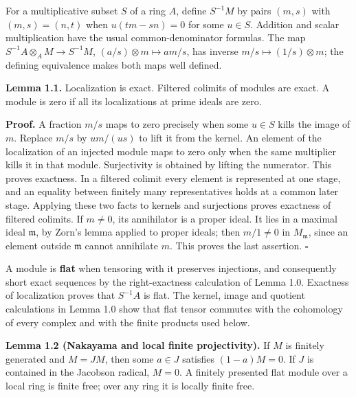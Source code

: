 \documentclass[11pt,a4paper,openany]{report}
\begin{document}
For a multiplicative subset \(S\) of a ring \(A\), define \(S^{-1}M\) by pairs \((m,s)\) with \((m,s)=(n,t)\) when \(u(tm-sn)=0\) for some \(u\in S\). Addition and scalar multiplication have the usual common-denominator formulas. The map \(S^{-1}A\otimes_A M\to S^{-1}M\), \((a/s)\otimes m\mapsto am/s\), has inverse \(m/s\mapsto (1/s)\otimes m\); the defining equivalence makes both maps well defined.

\textbf{Lemma 1.1.} Localization is exact. Filtered colimits of modules are exact. A module is zero if all its localizations at prime ideals are zero.

\textbf{Proof.} A fraction \(m/s\) maps to zero precisely when some \(u\in S\) kills the image of \(m\). Replace \(m/s\) by \(um/(us)\) to lift it from the kernel. An element of the localization of an injected module maps to zero only when the same multiplier kills it in that module. Surjectivity is obtained by lifting the numerator. This proves exactness. In a filtered colimit every element is represented at one stage, and an equality between finitely many representatives holds at a common later stage. Applying these two facts to kernels and surjections proves exactness of filtered colimits. If \(m\ne0\), its annihilator is a proper ideal. It lies in a maximal ideal \(\mathfrak m\), by Zorn's lemma applied to proper ideals; then \(m/1\ne0\) in \(M_{\mathfrak m}\), since an element outside \(\mathfrak m\) cannot annihilate \(m\). This proves the last assertion. \(\square\)

A module is \textbf{flat} when tensoring with it preserves injections, and consequently short exact sequences by the right-exactness calculation of Lemma 1.0. Exactness of localization proves that \(S^{-1}A\) is flat. The kernel, image and quotient calculations in Lemma 1.0 show that flat tensor commutes with the cohomology of every complex and with the finite products used below.

\textbf{Lemma 1.2 (Nakayama and local finite projectivity).} If \(M\) is finitely generated and \(M=JM\), then some \(a\in J\) satisfies \((1-a)M=0\). If \(J\) is contained in the Jacobson radical, \(M=0\). A finitely presented flat module over a local ring is finite free; over any ring it is locally finite free.
\end{document}
